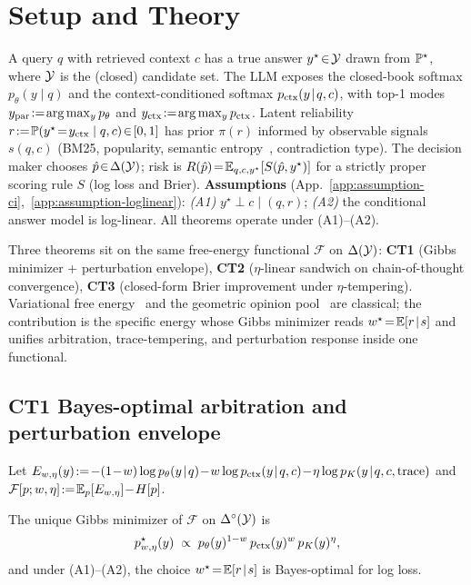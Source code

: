 \section{Setup and Theory}
\label{sec:method}

A query $q$ with retrieved context $c$ has a true answer $y^\star\!\in\!\mathcal{Y}$ drawn from $\mathbb{P}^\star$, where $\mathcal{Y}$ is the (closed) candidate set. The LLM exposes the closed-book softmax $p_\theta(y\!\mid\!q)$ and the context-conditioned softmax $p_{\mathrm{ctx}}(y\!\mid\!q,c)$, with top-1 modes $y_{\mathrm{par}}\!:=\!\arg\max_y p_\theta$ and $y_{\mathrm{ctx}}\!:=\!\arg\max_y p_{\mathrm{ctx}}$. Latent reliability $r\!:=\!\mathbb{P}(y^\star\!=\!y_{\mathrm{ctx}}\mid q,c)\!\in\![0,1]$ has prior $\pi(r)$ informed by observable signals $s(q,c)$ (BM25, popularity, semantic entropy~\citep{kuhn2023semantic}, contradiction type). The decision maker chooses $\hat p\!\in\!\Delta(\mathcal{Y})$; risk is $R(\hat p)\!=\!\mathbb{E}_{q,c,y^\star}[S(\hat p,y^\star)]$ for a strictly proper scoring rule $S$ (log loss and Brier). \textbf{Assumptions} (App.~\ref{app:assumption-ci},~\ref{app:assumption-loglinear}): \emph{(A1)} $y^\star\!\perp\!c\mid(q,r)$; \emph{(A2)} the conditional answer model is log-linear. All theorems operate under (A1)--(A2).

Three theorems sit on the same free-energy functional $\mathcal{F}$ on $\Delta(\mathcal{Y})$: \textbf{CT1} (Gibbs minimizer + perturbation envelope), \textbf{CT2} ($\eta$-linear sandwich on chain-of-thought convergence), \textbf{CT3} (closed-form Brier improvement under $\eta$-tempering). Variational free energy~\citep{jaynes1957information,wainwright2008graphical} and the geometric opinion pool~\citep{genest1986characterization,heskes1998selecting,mcconway1981marginalization} are classical; the contribution is the specific energy whose Gibbs minimizer reads $w^\star\!=\!\mathbb{E}[r\!\mid\!s]$ and unifies arbitration, trace-tempering, and perturbation response inside one functional.

\subsection{CT1 Bayes-optimal arbitration and perturbation envelope}
\label{sec:ct1}\label{sec:thm1}\label{sec:thm2}

Let $E_{w,\eta}(y)\!:=\!-(1\!-\!w)\log p_\theta(y\!\mid\!q)\!-\!w\log p_\ctx(y\!\mid\!q,c)\!-\!\eta\log p_K(y\!\mid\!q,c,\mathrm{trace})$ and $\mathcal{F}[p;w,\eta]\!:=\!\mathbb{E}_p[E_{w,\eta}]\!-\!H[p]$.

\begin{theorem}
\label{thm:ct1-body}
The unique Gibbs minimizer of $\mathcal{F}$ on $\Delta^\circ(\mathcal{Y})$ is
\begin{equation}
p^\star_{w,\eta}(y)\;\propto\;p_\theta(y)^{1-w}\,p_{\mathrm{ctx}}(y)^{w}\,p_K(y)^{\eta},
\label{eq:gibbs-min-body}
\end{equation}
and under (A1)--(A2), the choice $w^\star\!=\!\mathbb{E}[r\!\mid\!s]$ is Bayes-optimal for log loss.
\end{theorem}
\label{eq:F-master}\label{eq:thm1}\label{thm:bayes-arbitration}\label{thm:t1-axiomatic}\label{thm:minimax}\label{thm:t2-info}\label{thm:t2-separability-body}

